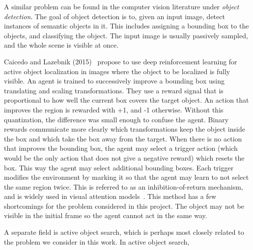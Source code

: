 
A similar problem can be found in the computer vision literature under \textit{object detection}.
The goal of object detection is to, given an input image, detect instances of semantic objects in it.
This includes assigning a bounding box to the objects, and classifying the object.
The input image is usually passively sampled, and the whole scene is visible at once.

Caicedo and Lazebnik (2015)~\cite{caicedo_active_2015} propose to use deep reinforcement learning for active object localization in images where the object to be localized is fully visible.
An agent is trained to successively improve a bounding box using translating and scaling transformations.
They use a reward signal that is proportional to how well the current box covers the target object.
An action that improves the region is rewarded with +1, and -1 otherwise.
Without this quantization, the difference was small enough to confuse the agent.
Binary rewards communicate more clearly which transformations keep the object inside the box and which take the box away from the target.
When there is no action that improves the bounding box, the agent may select a trigger action (which would be the only action that does not give a negative reward) which resets the box.
This way the agent may select additional bounding boxes.
Each trigger modifies the environment by marking it so that the agent may learn to not select the same region twice.
This is referred to as an inhibition-of-return mechanism, and is widely used in visual attention models~\cite{[16] in caicedo_active_2015}.
This method has a few shortcomings for the problem considered in this project.
The object may not be visible in the initial frame so the agent cannot act in the same way. 

A separate field is active object search, which is perhaps most closely related to the problem we consider in this work.
In active object search, %


% 

